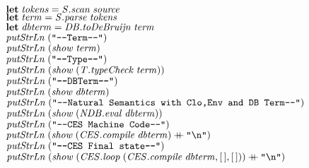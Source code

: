 \documentclass[10pt]{article}
\newcommand{\Conid}[1]{\mathit{#1}}
\newcommand{\Varid}[1]{\mathit{#1}}
\newcommand{\plus}{\mathbin{+\!\!\!+}}
\begin{document}
\begin{hscode}
${\hskip2.00em\relax\hskip1.00em\relax\mathbf{let}\;\Varid{tokens}\mathrel{=}\Varid{\Conid{S}.scan}\;\Varid{source}}$\\
${\hskip2.00em\relax\hskip1.00em\relax\mathbf{let}\;\Varid{term}\mathrel{=}\Varid{\Conid{S}.parse}\;\Varid{tokens}}$\\
${\hskip2.00em\relax\hskip1.00em\relax\mathbf{let}\;\Varid{dbterm}\mathrel{=}\Varid{\Conid{DB}.toDeBruijn}\;\Varid{term}}$\\
${\hskip2.00em\relax\hskip1.00em\relax\Varid{putStrLn}\;(\text{\tt \char34 ----Term----\char34})}$\\
${\hskip2.00em\relax\hskip1.00em\relax\Varid{putStrLn}\;(\Varid{show}\;\Varid{term})}$\\
${}$\\
${\hskip2.00em\relax\hskip1.00em\relax\Varid{putStrLn}\;(\text{\tt \char34 ----Type----\char34})}$\\
${\hskip2.00em\relax\hskip1.00em\relax\Varid{putStrLn}\;(\Varid{show}\;(\Varid{\Conid{T}.typeCheck}\;\Varid{term}))}$\\
${}$\\
${}$\\
${\hskip2.00em\relax\hskip1.00em\relax\Varid{putStrLn}\;(\text{\tt \char34 ----DBTerm----\char34})}$\\
${\hskip2.00em\relax\hskip1.00em\relax\Varid{putStrLn}\;(\Varid{show}\;\Varid{dbterm})}$\\
${\hskip2.00em\relax\hskip1.00em\relax\Varid{putStrLn}\;(\text{\tt \char34 ----Natural~Semantics~with~Clo,Env~and~DB~Term----\char34})}$\\
${\hskip2.00em\relax\hskip1.00em\relax\Varid{putStrLn}\;(\Varid{show}\;(\Varid{\Conid{NDB}.eval}\;\Varid{dbterm}))}$\\
${\hskip2.00em\relax\hskip1.00em\relax\Varid{putStrLn}\;(\text{\tt \char34 ----CES~Machine~Code----\char34})}$\\
${\hskip2.00em\relax\hskip1.00em\relax\Varid{putStrLn}\;(\Varid{show}\;(\Varid{\Conid{CES}.compile}\;\Varid{dbterm})\plus \text{\tt \char34 \char92 n\char34})}$\\
${}$\\
${\hskip2.00em\relax\hskip1.00em\relax\Varid{putStrLn}\;(\text{\tt \char34 ----CES~Final~state----\char34})}$\\
${\hskip2.00em\relax\hskip1.00em\relax\Varid{putStrLn}\;(\Varid{show}\;(\Varid{\Conid{CES}.loop}\;(\Varid{\Conid{CES}.compile}\;\Varid{dbterm},[\mskip1.5mu \mskip1.5mu],[\mskip1.5mu \mskip1.5mu]))\plus \text{\tt \char34 \char92 n\char34})}$\\

\end{hscode}
\end{document}
